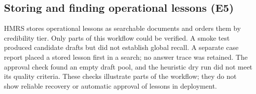 \subsection{Storing and finding operational lessons (E5)}
\label{sec:e3}
\label{sec:exp-e5}
HMRS stores operational lessons as searchable documents and orders them by
credibility tier. Only parts of this workflow could be verified. A smoke test
produced candidate drafts but did not establish global recall. A separate
case report placed a stored lesson first in a search; no answer trace was
retained. The
approval check found an empty draft pool, and the heuristic dry run did not
meet its quality criteria. These checks illustrate parts of the workflow;
they do not show reliable recovery or automatic approval of lessons in
deployment.
